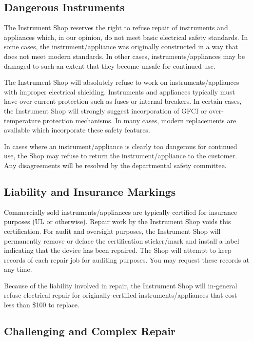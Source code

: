 \documentclass{training}
\begin{document}
\subsection{Dangerous Instruments}

The Instrument Shop reserves the right to refuse repair of instruments and appliances which, in our opinion, do not meet basic electrical safety standards.
In some cases, the instrument/appliance was originally constructed in a way that does not meet modern standards.
In other cases, instruments/appliances may be damaged to such an extent that they become unsafe for continued use.

The Instrument Shop will absolutely refuse to work on instruments/appliances with improper electrical shielding.
Instruments and appliances typically must have over-current protection such as fuses or internal breakers.
In certain cases, the Instrument Shop will strongly suggest incorporation of GFCI or over-temperature
protection mechanisms.
In many cases, modern replacements are available which incorporate these safety features.

In cases where an instrument/appliance is clearly too dangerous for continued use, the Shop may refuse to return the instrument/appliance to the customer.
Any disagreements will be resolved by the departmental safety committee.

\subsection{Liability and Insurance Markings}

Commercially sold instruments/appliances are typically certified for insurance purposes (UL or otherwise).
Repair work by the Instrument Shop voids this certification.
For audit and oversight purposes, the Instrument Shop will permanently remove or deface the certification sticker/mark and install a label indicating that the device has been repaired.
The Shop will attempt to keep records of each repair job for auditing purposes.
You may request these records at any time.

Because of the liability involved in repair, the Instrument Shop will in-general refuse electrical repair for originally-certified instruments/appliances that cost less than \$100 to replace.

\subsection{Challenging and Complex Repair}
\end{document}

